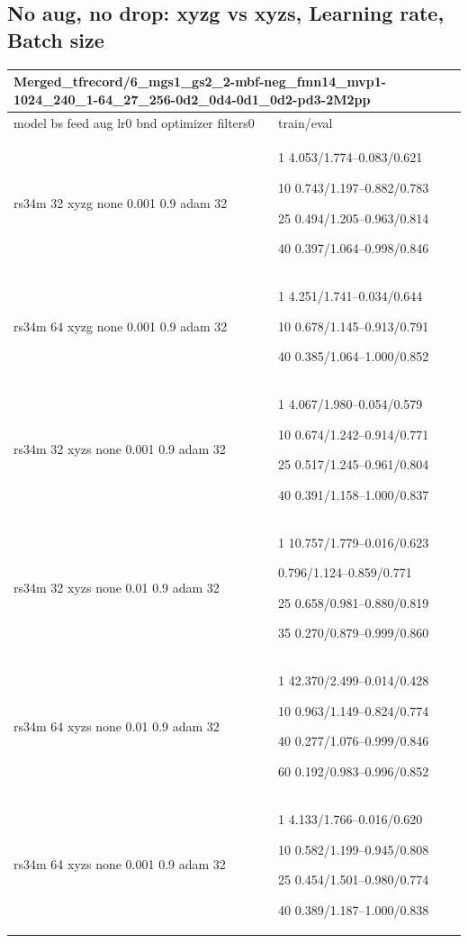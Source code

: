 \documentclass[,table,dvipsnames]{article}
\begin{document}
\subsection{No aug, no drop: xyzg vs xyzs, Learning rate, Batch size}
\noindent\begin{tabular}{|p{9cm}|p{6cm}| }	
	\hline
	\multicolumn{2}{|p{15cm}|}{Merged\_tfrecord/6\_mgs1\_gs2\_2-mbf-neg\_fmn14\_mvp1-1024\_240\_1-64\_27\_256-0d2\_0d4-0d1\_0d2-pd3-2M2pp}\\
	\hline
	model bs feed aug lr0 bnd optimizer filters0 & train/eval \\
	
	\rowcolor{blue!20}
	rs34m 32 xyzg none 0.001 0.9 adam 32& 1 4.053/1.774--0.083/0.621\par 10 0.743/1.197--0.882/0.783\par 25 0.494/1.205--0.963/0.814\par 40 0.397/1.064--0.998/0.846\\
	
	\rowcolor{yellow!20}	
	rs34m 64 xyzg none 0.001 0.9 adam 32& 1 4.251/1.741--0.034/0.644\par 10 0.678/1.145--0.913/0.791\par 40 0.385/1.064--1.000/0.852\\
	
		
	\hline\hline
	\rowcolor{green!20}
	\hline
	rs34m 32 xyzs none 0.001 0.9 adam 32 & 1 4.067/1.980--0.054/0.579\par 10 0.674/1.242--0.914/0.771\par 25 0.517/1.245--0.961/0.804\par 40 0.391/1.158--1.000/0.837\\
	
	
	\rowcolor{blue!20} 
	rs34m 32 xyzs none 0.01 0.9 adam 32& 1 10.757/1.779--0.016/0.623\par 0.796/1.124--0.859/0.771\par 25 0.658/0.981--0.880/0.819\par 35 0.270/0.879--0.999/0.860\\
	
	\rowcolor{Orange!20}
	rs34m 64 xyzs none 0.01 0.9 adam 32& 1 42.370/2.499--0.014/0.428\par 10 0.963/1.149--0.824/0.774\par 40 0.277/1.076--0.999/0.846\par 60 0.192/0.983--0.996/0.852\\
	
	\rowcolor{red!20}
	rs34m 64 xyzs none 0.001 0.9 adam 32& 1 4.133/1.766--0.016/0.620\par 10 0.582/1.199--0.945/0.808\par 25 0.454/1.501--0.980/0.774\par  40 0.389/1.187--1.000/0.838\\
	
	\hline
	
\end{tabular}
\end{document}
